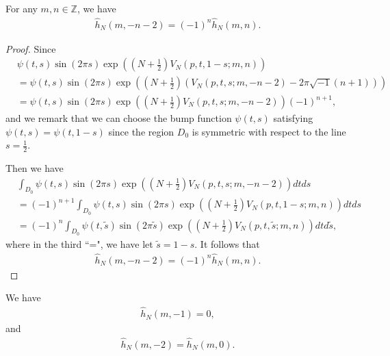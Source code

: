 \documentclass[12pt]{amsart}
\begin{document}
\begin{proposition} \label{prop-hmn}
    For any $m,n\in \mathbb{Z}$, we have
    \begin{align}
        \hat{h}_{N}(m,-n-2)=(-1)^{n}\hat{h}_{N}(m,n).
    \end{align}
\end{proposition}
\begin{proof}
    Since 
    \begin{align}
      &\psi(t,s)\sin(2\pi s)\exp\left((N+\frac{1}{2})V_N\left(p,t,1-s;m,n\right)\right) \\\nonumber
      &=\psi(t,s)\sin(2\pi s)\exp\left((N+\frac{1}{2})\left(V_{N}\left(p,t,s;m,-n-2\right)-2\pi\sqrt{-1}(n+1)\right)\right)\\\nonumber
      &=\psi(t,s)\sin(2\pi s)\exp\left((N+\frac{1}{2})V_N\left(p,t,s;m,-n-2\right)\right)(-1)^{n+1},
    \end{align}
 and   we remark that we can choose the bump function $\psi(t,s)$ satisfying $\psi(t,s)=\psi(t,1-s)$ since the region $D_0$ is symmetric with respect to the line $s=\frac{1}{2}$. 

Then we have
\begin{align}
    &\int_{D_0}\psi(t,s)\sin(2\pi s)\exp\left((N+\frac{1}{2})V_N\left(p,t,s;m,-n-2\right)\right)dtds\\\nonumber
    &=(-1)^{n+1}\int_{D_0}\psi(t,s)\sin(2\pi s)\exp\left((N+\frac{1}{2})V_N\left(p,t,1-s;m,n\right)\right)dtds\\\nonumber
    &=(-1)^{n}\int_{D_0}\psi(t,\tilde{s})\sin(2\pi \tilde{s})\exp\left((N+\frac{1}{2})V_N\left(p,t,\tilde{s};m,n\right)\right)dtd\tilde{s},
\end{align}
where in the third ``=", we have let $\tilde{s}=1-s$.  It follows that 
\begin{align}
        \hat{h}_{N}(m,-n-2)=(-1)^{n}\hat{h}_{N}(m,n).
    \end{align}
\end{proof}
\begin{corollary}
    We have  
    \begin{align} \label{formula-bigcancel}
        \hat{h}_{N}(m,-1)=0,
    \end{align}
    and 
    \begin{align}
    \hat{h}_{N}(m,-2)=\hat{h}_{N}(m,0).    
    \end{align}
\end{corollary}
\end{document}
